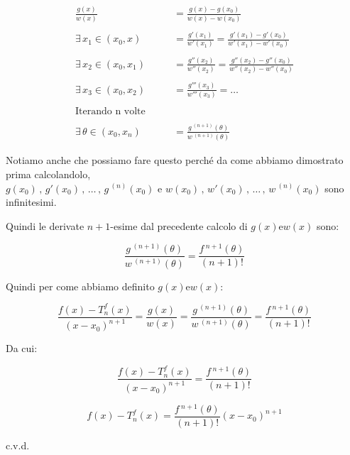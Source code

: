 \documentclass[../dimostrazioni]{subfiles}
\begin{document}
            \begin{align*}
                \frac{g(x)}{w(x)} &= \frac{g(x) - g(x_0)}{w(x) - w(x_0)}\\
                \\
                \exists \, x_1 \in (x_0, x) \qquad &= \frac{g'(x_1)}{w'(x_1)} = \frac{g'(x_1) - g'(x_0)}{w'(x_1) - w'(x_0)}\\
                \\
                \exists \, x_2 \in (x_0, x_1) \qquad &= \frac{g''(x_2)}{w''(x_2)} = \frac{g''(x_2) - g''(x_0)}{w''(x_2) - w''(x_0)}\\
                \\
                \exists \, x_3 \in (x_0, x_2) \qquad &= \frac{g'''(x_3)}{w'''(x_3)} = \dots\\
                \\
                \text{Iterando n volte}\\
                \\
                \exists \, \theta \in (x_0, x_n) \qquad &= \frac{g\,^{(n+1)}(\theta)}{w\,^{(n+1)}(\theta)}
            \end{align*}

            Notiamo anche che possiamo fare questo perché da come abbiamo dimostrato prima calcolandolo,\\ 
            \(g(x_0)\,,\, g'(x_0)\,,\, \dots\,,\, g\,^{(n)} (x_0) \) e \( w(x_0)\,,\, w'(x_0)\,,\, \dots\,,\, w\,^{(n)} (x_0)\) sono infinitesimi.

            Quindi le derivate \(n+1\)-esime dal precedente calcolo di \(g(x) \text{e} w(x)\) sono:

            \[  \frac{g\,^{(n+1)}(\theta)}{w\,^{(n+1)}(\theta)} = \frac{f\,^{n+1}(\theta)}{(n+1)!} \]

            Quindi per come abbiamo definito \(g(x) \text{e} w(x)\):

            \[  \frac{f(x) - T _n ^ f (x)}{(x-x_0)^{n+1}} = \frac{g(x)}{w(x)} = \frac{g\,^{(n+1)}(\theta)}{w\,^{(n+1)}(\theta)} = \frac{f\,^{n+1}(\theta)}{(n+1)!}   \]

            Da cui:

            \[  \frac{f(x) - T _n ^ f (x)}{(x-x_0)^{n+1}} = \frac{f\,^{n+1}(\theta)}{(n+1)!}   \]

            \[  f(x) - T _n ^ f (x) = \frac{f\,^{n+1}(\theta)}{(n+1)!}(x-x_0)^{n+1} \]

            c.v.d.
        
\end{document}
